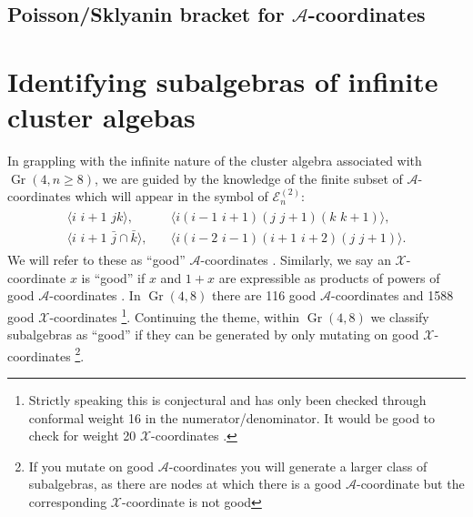 \documentclass[11pt]{article}
\DeclareMathOperator{\Gr}{Gr}
\def\ket#1{\langle #1 \rangle}
\def\xcoord{$\mathcal{X}$-coordinate }
\def\xcoords{$\mathcal{X}$-coordinates }
\def\a{\mathcal{A}}
\def\acoord{$\mathcal{A}$-coordinate }
\def\acoords{$\mathcal{A}$-coordinates }
\def\flag{{\huge \color{red} \textinterrobang}}
\def\pdfeq#1{\texorpdfstring{$#1$}{a}}
\begin{document}
\subsection{Poisson/Sklyanin bracket for \pdfeq{\a}-coordinates}

\section{Identifying subalgebras of infinite cluster algebas}

In grappling with the infinite nature of the cluster algebra associated with $\Gr(4,n\ge8)$, we are guided by the knowledge of the finite subset of \acoords which will appear in the symbol of $\mathcal{E}^{(2)}_n$\cite{CaronHuot:2011ky}: 
\begin{align}\label{def:good-letters}
\begin{split}
\ket{i\,\,i{+}1\,\,jk},& \quad 
\ket{i(i{-}1\,\,i{+}1)(j\,\,j{+}1)(k\,\,k{+}1)}, \\ 
\ket{i\,\,i{+}1\,\,\bar{j}\cap\bar{k}},& \quad
\ket{i(i{-}2\,\,i{-}1)(i{+}1\,\,i{+}2)(j\,\,j{+}1)}.
\end{split}
\end{align}
We will refer to these as ``good'' \acoords. Similarly, we say an \xcoord $x$ is ``good'' if $x$ and $1+x$ are expressible as products of powers of good \acoords. In $\Gr(4,8)$ there are 116 good \acoords and 1588 good \xcoords \flag \footnote{Strictly speaking this is conjectural and has only been checked through conformal weight 16 in the numerator/denominator. It would be good to check for weight 20 \xcoords.}. Continuing the theme, within $\Gr(4,8)$ we classify subalgebras as ``good'' if they can be generated by only mutating on good \xcoords\footnote{If you mutate on good \acoords you will generate a larger class of subalgebras, as there are nodes at which there is a good \acoord but the corresponding \xcoord is not good}.
\end{document}
